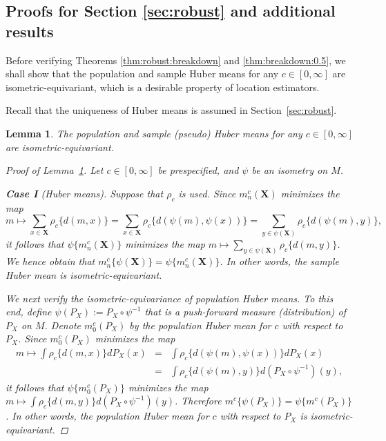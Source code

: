\documentclass[preprint]{imsart}
\newcommand{\bX}{\mathbf{X}}
\theoremstyle{plain}
\newtheorem{lemma}{Lemma}
\theoremstyle{remark}
\begin{document}
\begin{appendix}
\subsection{Proofs for Section \ref{sec:robust} and additional results}

Before verifying Theorems \ref{thm:robust:breakdown} and \ref{thm:breakdown:0.5}, we shall show that the population and sample Huber means for any $c \in [0, \infty]$ are isometric-equivariant, which is a desirable property of location estimators.

Recall that the uniqueness of Huber means is assumed in Section~\ref{sec:robust}. 


\begin{lemma}\label{lem:huber:isoequi}
The population and sample (pseudo) Huber means for any $c \in [0, \infty]$ are isometric-equivariant.
\begin{proof}[Proof of Lemma~\ref{lem:huber:isoequi}]
Let $c \in [0, \infty]$ be prespecified, and $\psi$ be an isometry on $M$. 

\textbf{Case I} (Huber means). Suppose that $\rho_{c}$ is used. Since $m^{c}_{n}(\mathbf{X})$ minimizes the map $$m \mapsto \sum_{x \in \mathbf{X}} \rho_{c}\{d(m, x)\} = \sum_{x \in \mathbf{X}} \rho_{c}\{d(\psi(m), \psi(x))\} = \sum_{y \in \psi(\mathbf{X})} \rho_{c}\{d(\psi(m), y)\},$$ it follows that $\psi\{m^{c}_{n}(\bX)\}$ minimizes the map $m \mapsto \sum_{y\in \psi(\mathbf{X})} \rho_{c}\{d(m, y)\}$. We hence obtain that $m^{c}_{n}\{\psi(\bX)\} = \psi\{m^{c}_{n}(\bX)\}$. In other words, the sample Huber mean is isometric-equivariant.

We next verify the isometric-equivariance of \emph{population} Huber means. To this end, define $\psi(P_{X}):=P_{X} \circ \psi^{-1}$ that is a push-forward measure (distribution) of $P_{X}$ on $M$. Denote $m_{0}^{c}(P_{X})$ by the population Huber mean for $c$ with respect to $P_{X}$. Since $m_{0}^{c}(P_{X})$ minimizes the map 
\begin{eqnarray*}
m \mapsto \int \rho_{c}\{d(m, x)\}dP_{X}(x) &=& \int \rho_{c}\{d(\psi(m), \psi(x))\}dP_{X}(x) \\
&=& \int \rho_{c}\{d(\psi(m), y)\}d(P_{X}\circ \psi^{-1})(y),
\end{eqnarray*}
it follows that $\psi\{m_{0}^{c}(P_{X})\}$ minimizes the map $m \mapsto \int \rho_{c}\{d(m, y)\}d(P_{X} \circ \psi^{-1})(y)$. Therefore $m^{c}\{\psi(P_{X})\} = \psi\{m^{c}(P_{X})\}$. In other words, the population Huber mean for $c$ with respect to $P_{X}$ is isometric-equivariant.



\end{proof}
\end{lemma}
\end{appendix}
\end{document}
